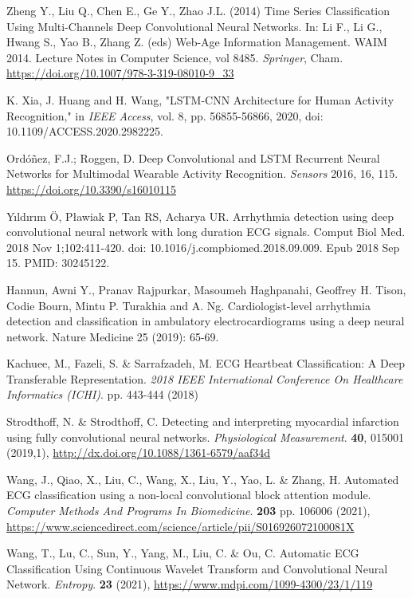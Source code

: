 \documentclass{ieeeaccess}
\begin{document}
\begin{thebibliography}{1}
Zheng Y., Liu Q., Chen E., Ge Y., Zhao J.L. (2014) Time Series Classification Using Multi-Channels Deep Convolutional Neural Networks. In: Li F., Li G., Hwang S., Yao B., Zhang Z. (eds) Web-Age Information Management. WAIM 2014. Lecture Notes in Computer Science, vol 8485. {\em Springer}, Cham. \url{https://doi.org/10.1007/978-3-319-08010-9_33}


 K. Xia, J. Huang and H. Wang, "LSTM-CNN Architecture for Human Activity Recognition," in {\em IEEE Access}, vol. 8, pp. 56855-56866, 2020, doi: 10.1109/ACCESS.2020.2982225.

 Ordóñez, F.J.; Roggen, D. Deep Convolutional and LSTM Recurrent Neural Networks for Multimodal Wearable Activity Recognition. {\em Sensors} 2016, 16, 115. \url{https://doi.org/10.3390/s16010115}

Yıldırım Ö, Pławiak P, Tan RS, Acharya UR. Arrhythmia detection using deep convolutional neural network with long duration ECG signals. Comput Biol Med. 2018 Nov 1;102:411-420. doi: 10.1016/j.compbiomed.2018.09.009. Epub 2018 Sep 15. PMID: 30245122.

Hannun, Awni Y., Pranav Rajpurkar, Masoumeh Haghpanahi, Geoffrey H. Tison, Codie Bourn, Mintu P. Turakhia and A. Ng. Cardiologist-level arrhythmia detection and classification in ambulatory electrocardiograms using a deep neural network. Nature Medicine 25 (2019): 65-69.

Kachuee, M., Fazeli, S. \& Sarrafzadeh, M. ECG Heartbeat Classification: A Deep Transferable Representation. {\em 2018 IEEE International Conference On Healthcare Informatics (ICHI)}. pp. 443-444 (2018)

Strodthoff, N. \& Strodthoff, C. Detecting and interpreting myocardial infarction using fully convolutional neural networks. {\em Physiological Measurement}. \textbf{40}, 015001 (2019,1), \url{http://dx.doi.org/10.1088/1361-6579/aaf34d}

 Wang, J., Qiao, X., Liu, C., Wang, X., Liu, Y., Yao, L. \& Zhang, H. Automated ECG classification using a non-local convolutional block attention module. {\em Computer Methods And Programs In Biomedicine}. \textbf{203} pp. 106006 (2021), \url{https://www.sciencedirect.com/science/article/pii/S016926072100081X}

Wang, T., Lu, C., Sun, Y., Yang, M., Liu, C. \& Ou, C. Automatic ECG Classification Using Continuous Wavelet Transform and Convolutional Neural Network. {\em Entropy}. \textbf{23} (2021), \url{https://www.mdpi.com/1099-4300/23/1/119}


\end{thebibliography}
\end{document}
